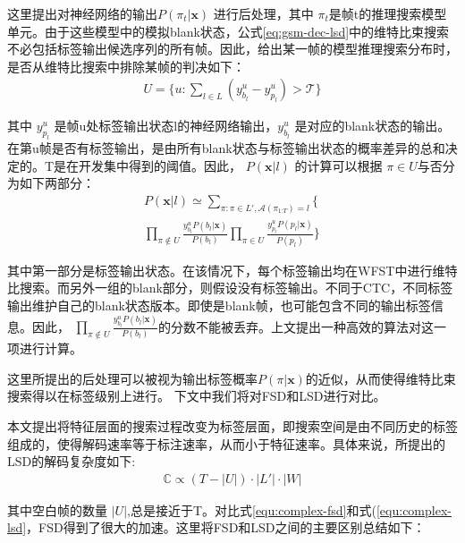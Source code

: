 这里提出对神经网络的输出$P(\pi_t|\mathbf{x})$ 进行后处理，其中 $\pi_t $是帧t的推理搜索模型单元。由于这些模型中的模拟blank状态，公式\ref{eq:gsm-dec-lsd}中的维特比束搜索不必包括标签输出候选序列的所有帧。因此，给出某一帧的模型推理搜索分布时，是否从维特比搜索中排除某帧的判决如下：
  \begin{equation} 
       \label{eq:com-blk-idx-gsm}
       \begin{split}
U=\{u:\sum_{l\in L}(y^{u}_{b_l}-y^{u}_{p_l})> \mathcal{T}\}
\end{split}
\end{equation}


其中 $y^{u}_{p_l}$ 是帧u处标签输出状态l的神经网络输出，$y^{u}_{b_l}$ 是对应的blank状态的输出。在第u帧是否有标签输出，是由所有blank状态与标签输出状态的概率差异的总和决定的。T是在开发集中得到的阈值。因此， $P(\mathbf{x}|l)$  的计算可以根据 $\pi\in U$与否分为如下两部分：
\begin{equation} \label{eq:viterbi-blk-hmm2}
  \begin{split}
P(\mathbf{x}|l)
\simeq\sum_{\pi:\pi \in L',\mathcal{A}(\pi_{1\mathord{:}T})=l}
         \{\   \\ %
         \prod_{\pi\not\in U}\frac{y_{b_l}^u P(b_l|\mathbf{x})}{P(b_l)} \prod_{\pi\in U}\frac{y_{p_l}^u P(p_l|\mathbf{x})}{P(p_l)}
         \}
         \end{split}
       \end{equation}   


其中第一部分是标签输出状态。在该情况下，每个标签输出均在WFST中进行维特比搜索。而另外一组的blank部分，则假设没有标签输出。不同于CTC，不同标签输出维护自己的blank状态版本。即使是blank帧，也可能包含不同的输出标签信息。因此， $\prod_{\pi\not\in U}\frac{y_{b_l}^u P(b_l|\mathbf{x})}{P(b_l)}$的分数不能被丢弃。上文提出一种高效的算法对这一项进行计算。

这里所提出的后处理可以被视为输出标签概率$P(\pi|\mathbf{x})$的近似，从而使得维特比束搜索得以在标签级别上进行。
下文中我们将对FSD和LSD进行对比。

本文提出将特征层面的搜索过程改变为标签层面，即搜索空间是由不同历史的标签组成的，使得解码速率等于标注速率，从而小于特征速率。具体来说，所提出的LSD的解码复杂度如下:
  \begin{equation}
\label{equ:complex-lsd}
\begin{split}
\mathbb{C} \propto (T-|U|)\cdot|L'| \cdot|W|
\end{split}
\end{equation}


其中空白帧的数量 $|U|$,总是接近于T。对比式\ref{equ:complex-fsd}和式(\ref{equ:complex-lsd}，FSD得到了很大的加速。这里将FSD和LSD之间的主要区别总结如下：

